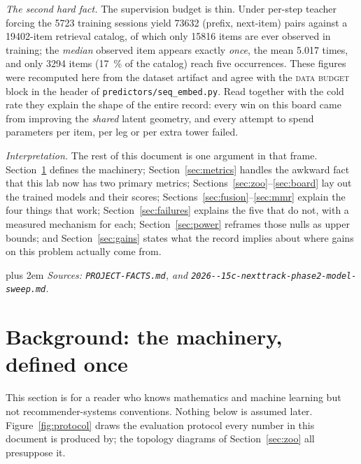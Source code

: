 \documentclass[11pt]{article}
\begin{document}
\emph{The second hard fact.} The supervision budget is thin. Under per-step
teacher forcing the \num{5723} training sessions yield \num{73632}
(prefix, next-item) pairs against a \num{19402}-item retrieval catalog, of which
only \num{15816} items are ever observed in training; the \emph{median} observed
item appears exactly \emph{once}, the mean \num{5.017} times, and only
\num{3294} items (\SI{17}{\percent} of the catalog) reach five occurrences.
These figures were recomputed here from the dataset artifact and agree with the
\textsc{data budget} block in the header of
\texttt{predictors/seq\_embed.py}. Read together with the cold rate they explain
the shape of the entire record: every win on this board came from improving the
\emph{shared} latent geometry, and every attempt to spend parameters per item,
per leg or per extra tower failed.

\emph{Interpretation.} The rest of this document is one argument in that frame.
Section~\ref{sec:machinery} defines the machinery; Section~\ref{sec:metrics}
handles the awkward fact that this lab now has two primary metrics;
Sections~\ref{sec:zoo}--\ref{sec:board} lay out the trained models and their
scores; Sections~\ref{sec:fusion}--\ref{sec:mmr} explain the four things that
work; Section~\ref{sec:failures} explains the five that do not, with a measured
mechanism for each; Section~\ref{sec:power} reframes those nulls as upper
bounds; and Section~\ref{sec:gains} states what the record implies about where
gains on this problem actually come from.

{\rightskip=0pt plus 2em \emph{Sources: \texttt{PROJECT-FACTS.md}, and \texttt{2026--\allowbreak 15c-\allowbreak nexttrack-\allowbreak phase2-\allowbreak model-\allowbreak sweep.md}.}\par}

\clearpage
\section{Background: the machinery, defined once}
\label{sec:machinery}



This section is for a reader who knows mathematics and machine learning but not
recommender-systems conventions. Nothing below is assumed later.
Figure~\ref{fig:protocol} draws the evaluation protocol every number in this
document is produced by; the topology diagrams of Section~\ref{sec:zoo} all
presuppose it.
\end{document}
